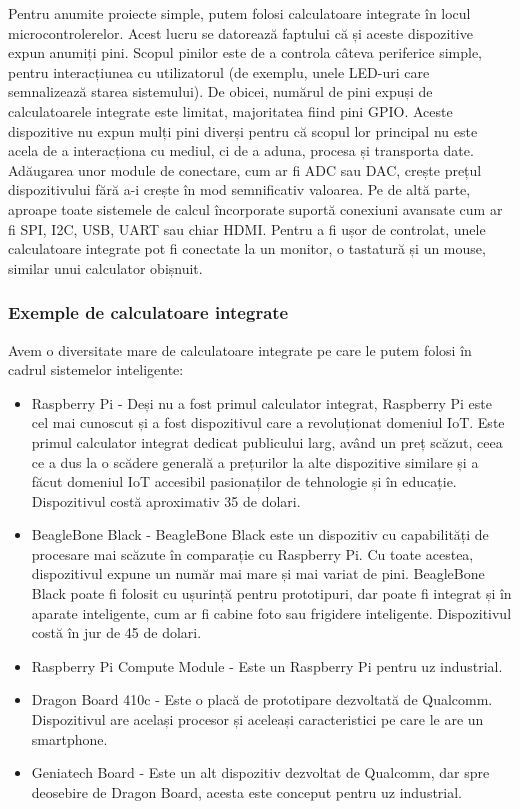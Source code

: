 Pentru anumite proiecte simple, putem folosi calculatoare integrate în locul
microcontrolerelor. Acest lucru se datorează faptului că și aceste dispozitive
expun anumiți pini. Scopul pinilor este de a controla câteva periferice simple,
pentru interacțiunea cu utilizatorul (de exemplu, unele LED-uri care
semnalizează starea sistemului). De obicei, numărul de pini expuși de
calculatoarele integrate este limitat, majoritatea fiind pini GPIO. Aceste
dispozitive nu expun mulți pini diverși pentru că scopul lor principal nu este
acela de a interacționa cu mediul, ci de a aduna, procesa și transporta date.
Adăugarea unor module de conectare, cum ar fi ADC sau DAC, crește prețul
dispozitivului fără a-i crește în mod semnificativ valoarea. Pe de altă parte,
aproape toate sistemele de calcul încorporate suportă conexiuni avansate cum ar
fi SPI, I2C, USB, UART sau chiar HDMI. Pentru a fi ușor de controlat, unele
calculatoare integrate pot fi conectate la un monitor, o tastatură și un mouse,
similar unui calculator obișnuit.

\subsubsection{Exemple de calculatoare integrate}
\label{sec:embed-ics-embed-ex}

Avem o diversitate mare de calculatoare integrate pe care le putem folosi în
cadrul sistemelor inteligente:

\begin{itemize}
	\item Raspberry Pi - Deși nu a fost primul calculator integrat,
		Raspberry Pi este cel mai cunoscut și a fost dispozitivul care a
		revoluționat domeniul IoT. Este primul calculator integrat
		dedicat publicului larg, având un preț scăzut, ceea ce a dus la
		o scădere generală a prețurilor la alte dispozitive similare și
		a făcut domeniul IoT accesibil pasionaților de tehnologie și în
		educație. Dispozitivul costă aproximativ 35 de dolari.
	\item BeagleBone Black - BeagleBone Black este un dispozitiv cu
		capabilități de procesare mai scăzute în comparație cu Raspberry
		Pi. Cu toate acestea, dispozitivul expune un număr mai mare și
		mai variat de pini. BeagleBone Black poate fi folosit cu
		ușurință pentru prototipuri, dar poate fi integrat și în aparate
		inteligente, cum ar fi cabine foto sau frigidere inteligente.
		Dispozitivul costă în jur de 45 de dolari.
	\item Raspberry Pi Compute Module - Este un Raspberry Pi pentru uz
		industrial.
	\item Dragon Board 410c - Este o placă de prototipare dezvoltată de
		Qualcomm. Dispozitivul are același procesor și aceleași
		caracteristici pe care le are un smartphone.
	\item Geniatech Board - Este un alt dispozitiv dezvoltat de Qualcomm,
		dar spre deosebire de Dragon Board, acesta este conceput pentru
		uz industrial.
\end{itemize}

